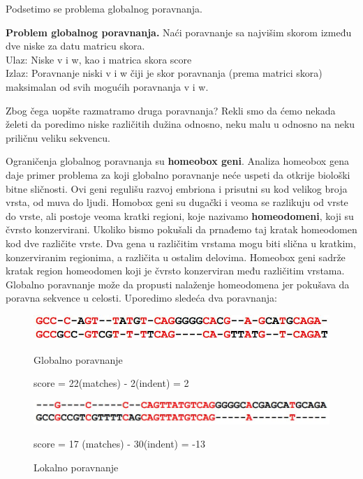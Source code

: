 Podsetimo se problema globalnog poravnanja.
\begin{tcolorbox}\textbf{Problem globalnog poravnanja.}
	Naći poravnanje sa najvišim skorom između dve niske za datu matricu skora. \\
	Ulaz: Niske v i w, kao i matrica skora score \\
	Izlaz: Poravnanje niski v i w čiji je skor poravnanja (prema matrici skora) maksimalan od svih mogućih poravnanja v i w. 
\end{tcolorbox}


Zbog čega uopšte razmatramo druga poravnanja? Rekli smo da ćemo nekada želeti da poredimo niske različitih dužina odnosno, neku malu u odnosno na neku priličnu veliku sekvencu. 

Ograničenja globalnog poravnanja su \textbf{homeobox geni}. Analiza homeobox gena daje primer problema za koji globalno poravnanje neće uspeti da otkrije biološki bitne sličnosti. Ovi geni regulišu razvoj embriona i prisutni su kod velikog broja vrsta, od muva do ljudi. Homobox geni su dugački i veoma se razlikuju od vrste do vrste, ali postoje veoma kratki regioni, koje nazivamo \textbf{homeodomeni}, koji su čvrsto konzervirani. Ukoliko bismo pokušali da prnađemo taj kratak homeodomen kod dve različite vrste. Dva gena u različitim vrstama mogu biti slična u kratkim, konzerviranim regionima, a različita u ostalim delovima. Homeobox geni sadrže kratak region homeodomen koji je čvrsto konzerviran među različitim vrstama. Globalno poravnanje može da propusti nalaženje homeodomena jer pokušava da poravna sekvence u celosti. Uporedimo sledeća dva poravnanja: 

\begin{figure}[!htb]
 \begin{minipage}{0.49\textwidth}
    \includegraphics[width=\linewidth]{poglavlja/5/slike/globalno.JPG}
   \caption{Globalno poravnanje}
   \label{globalno}
   score = 22(matches) - 2(indent) = 2
 \end{minipage}
 \hfill
 \begin{minipage}{0.49\textwidth}
   \includegraphics[width=\linewidth]{poglavlja/5/slike/lokalno.JPG}
   \caption{Lokalno poravnanje}
   \label{lokalno}
   score = 17 (matches) - 30(indent) = -13
 \end{minipage}
\end{figure}

